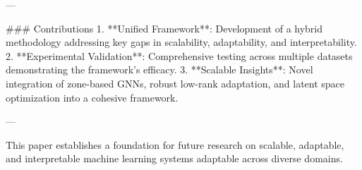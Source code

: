 ---

### Contributions  
1. **Unified Framework**: Development of a hybrid methodology addressing key gaps in scalability, adaptability, and interpretability.  
2. **Experimental Validation**: Comprehensive testing across multiple datasets demonstrating the framework's efficacy.  
3. **Scalable Insights**: Novel integration of zone-based GNNs, robust low-rank adaptation, and latent space optimization into a cohesive framework.

--- 

This paper establishes a foundation for future research on scalable, adaptable, and interpretable machine learning systems adaptable across diverse domains.